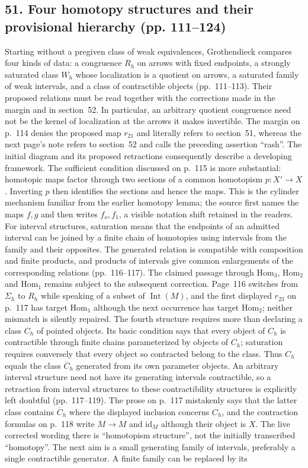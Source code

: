 \documentclass[10pt,oneside]{book}
\begin{document}
\subsection*{51. Four homotopy structures and their provisional hierarchy (pp. 111--124)}
Starting without a pregiven class of weak equivalences, Grothendieck compares four kinds of data: a congruence $R_h$ on arrows with fixed endpoints, a strongly saturated class $W_h$ whose localization is a quotient on arrows, a saturated family of weak intervals, and a class of contractible objects (pp.~111--113). Their proposed relations must be read together with the corrections made in the margin and in section~52. In particular, an arbitrary quotient congruence need not be the kernel of localization at the arrows it makes invertible. The margin on p.~114 denies the proposed map $r_{21}$ and literally refers to section~51, whereas the next page's note refers to section~52 and calls the preceding assertion ``rash''. The initial diagram and its proposed retractions consequently describe a developing framework. The sufficient condition discussed on p.~115 is more substantial: homotopic maps factor through two sections of a common homotopism $p:X'\to X$. Inverting $p$ then identifies the sections and hence the maps. This is the cylinder mechanism familiar from the earlier homotopy lemma; the source first names the maps $f,g$ and then writes $f_o,f_1$, a visible notation shift retained in the readers. For interval structures, saturation means that the endpoints of an admitted interval can be joined by a finite chain of homotopies using intervals from the family and their opposites. The generated relation is compatible with composition and finite products, and products of intervals give common enlargements of the corresponding relations (pp.~116--117). The claimed passage through $\mathrm{Hom}_3$, $\mathrm{Hom}_2$ and $\mathrm{Hom}_1$ remains subject to the subsequent correction. Page~116 switches from $\Sigma_h$ to $R_h$ while speaking of a subset of $\operatorname{Int}(M)$, and the first displayed $r_{23}$ on p.~117 has target $\mathrm{Hom}_1$ although the next occurrence has target $\mathrm{Hom}_2$; neither mismatch is silently repaired. The fourth structure requires more than declaring a class $C_h$ of pointed objects. Its basic condition says that every object of $C_h$ is contractible through finite chains parameterized by objects of $C_h$; saturation requires conversely that every object so contracted belong to the class. Thus $C_h$ equals the class $\overline C_h$ generated from its own parameter objects. An arbitrary interval structure need not have its generating intervals contractible, so a retraction from interval structures to these contractibility structures is explicitly left doubtful (pp.~117--119). The prose on p.~117 mistakenly says that the latter class contains $\overline C_h$ where the displayed inclusion concerns $C_h$, and the contraction formulas on p.~118 write $M\to M$ and $\mathrm{id}_M$ although their object is $X$. The live corrected wording there is ``homotopism structure'', not the initially transcribed ``homotopy''. The next aim is a small generating family of intervals, preferably a single contractible generator. A finite family can be replaced by its 
\end{document}
